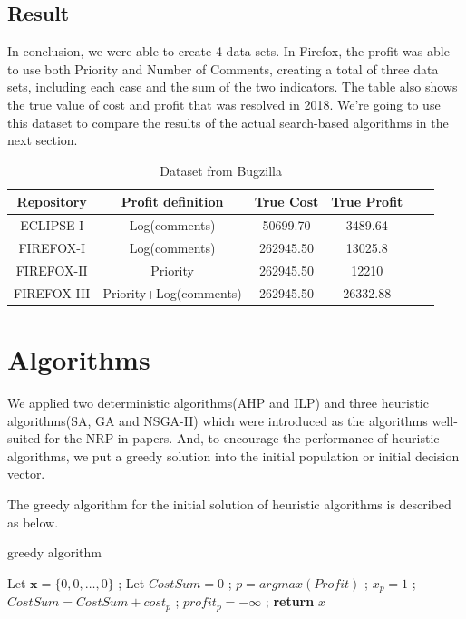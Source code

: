 \subsection{Result}

In conclusion, we were able to create 4 data sets. In Firefox, the profit was able to use both Priority and Number of Comments, creating a total of three data sets, including each case and the sum of the two indicators. The table also shows the true value of cost and profit that was resolved in 2018. We're going to use this dataset to compare the results of the actual search-based algorithms in the next section.

\begin{table} [H]
  \caption{Dataset from Bugzilla}
  \label{tab:commands}
  \begin{tabular}{cccccl}
    \toprule
    Repository&Profit definition&True Cost&True Profit\\
    \midrule
    ECLIPSE-I&Log(comments)&50699.70& 3489.64 \\
    FIREFOX-I&Log(comments)& 262945.50& 13025.8 \\
    FIREFOX-II&Priority& 262945.50& 12210 \\
    FIREFOX-III&Priority+Log(comments)& 262945.50& 26332.88 \\
    \bottomrule
  \end{tabular}
\label{table:Dataset}
\end{table}


\section{Algorithms}
We applied two deterministic algorithms(AHP and ILP) and three heuristic algorithms(SA, GA and NSGA-II) which were introduced as the algorithms well-suited for the NRP in papers\cite{NRP}\cite{ILP}\cite{IGA}\cite{MONRP}. And, to encourage the performance of heuristic algorithms, we put a greedy solution into the initial population or initial decision vector.

The greedy algorithm for the initial solution of heuristic algorithms is described as below. 

\begin{algorithm}
\caption{greedy algorithm}\label{alg:greedy}
\begin{algorithmic}
    \State Let $\textbf{x} = \{0, 0, \ldots, 0\}$ ;
    \State Let $CostSum = 0$ ;
        \State $p = argmax(Profit)$ ;
            \State $x_p = 1$ ;
            \State $CostSum = CostSum + cost_p$ ;
        \EndIf
        \State $profit_p = -\infty$ ;
    \EndFor
    \textbf{return} $x$
\end{algorithmic}
\end{algorithm}


